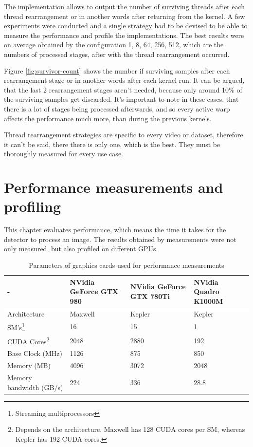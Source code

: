 The implementation allows to output the number of surviving threads after each thread rearrangement or in another words after returning from the kernel. A few experiments were conducted and a single strategy had to be devised to be able to measure the performance and profile the implementations. The best results were on average obtained by the configuration 1, 8, 64, 256, 512, which are the numbers of processed stages, after with the thread rearrangement occurred.

Figure \ref{fig:survivor-count} shows the number if surviving samples after each rearrangement stage or in another words after each kernel run. It can be argued, that the last 2 rearrangement stages aren't needed, because only around 10\% of the surviving samples get discarded. It's important to note in these cases, that there is a lot of stages being processed afterwards, and so every active warp affects the performance much more, than during the previous kernels.

Thread rearrangement strategies are specific to every video or dataset, therefore it can't be said, there there is only one, which is the best. They must be thoroughly measured for every use case.

\chapter{Performance measurements and profiling}

This chapter evaluates performance, which means the time it takes for the detector to process an image. The results obtained by measurements were not only measured, but also profiled on different GPUs.

\begin{center}
\begin{table}[htbp]
\begin{tabularx}{\textwidth}{| X | X | X | X |}
\hline
- & NVidia GeForce GTX 980 & NVidia GeForce GTX 780Ti & NVidia Quadro K1000M \\
\hline
Architecture & Maxwell & Kepler & Kepler \\
\hline
SM's\footnote{Streaming multiprocessors} & 16 & 15 & 1 \\
\hline
CUDA Cores\footnote{Depends on the architecture. Maxwell has 128 CUDA cores per SM, whereas Kepler has 192 CUDA cores.} & 2048 & 2880 & 192 \\
\hline
Base Clock (MHz) & 1126 & 875 & 850 \\
\hline
Memory (MB) & 4096 & 3072 & 2048 \\
\hline
Memory bandwidth (GB/s) & 224 & 336 & 28.8 \\
\hline
\end{tabularx}
\caption{Parameters of graphics cards used for performance measurements}
\label{tab:parameters-gpu}
\end{table}
\end{center}

